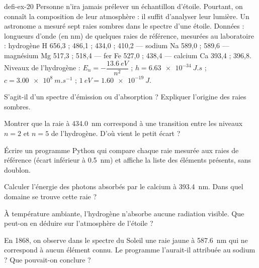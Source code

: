 \begin{blocEdition}{defi-ex-20}
Personne n'ira jamais prélever un échantillon d'étoile. Pourtant, on connaît la composition de leur atmosphère : il suffit d'analyser
leur lumière. Un astronome a mesuré sept raies sombres dans le spectre d'une étoile.
Données : longueurs d'onde (en nm) de quelques raies de référence, mesurées au laboratoire : hydrogène H 656,3 ; 486,1 ; 434,0 ;
410,2 — sodium Na 589,0 ; 589,6 — magnésium Mg 517,3 ; 518,4 — fer Fe 527,0 ; 438,4 — calcium Ca 393,4 ; 396,8. Niveaux de l'hydrogène :
$E_n=-\dfrac{\qty{13,6}{eV}}{n^2}$ ; $h=\qty{6,63e-34}{J.s}$ ; $c=\qty{3,00e8}{m.s^{-1}}$ ; $\qty{1}{eV}=\qty{1,60e-19}{J}$.
\begin{questions}
\item S'agit-il d'un spectre d'émission ou d'absorption ? Expliquer l'origine des raies sombres.
\item Montrer que la raie à \qty{434,0}{nm} correspond à une transition entre les niveaux $n=2$ et $n=5$ de l'hydrogène. D'où vient le petit
écart ?
\item Écrire un programme Python qui compare chaque raie mesurée aux raies de référence (écart inférieur à \qty{0,5}{nm}) et affiche la liste
des éléments présents, sans doublon.
\item Calculer l'énergie des photons absorbés par le calcium à \qty{393,4}{nm}. Dans quel domaine se trouve cette raie ?
\item À température ambiante, l'hydrogène n'absorbe aucune radiation visible. Que peut-on en déduire sur l'atmosphère de l'étoile ?
\item En 1868, on observe dans le spectre du Soleil une raie jaune à \qty{587,6}{nm} qui ne correspond à aucun élément connu. Le programme
l'aurait-il attribuée au sodium ? Que pouvait-on conclure ?
\end{questions}
\end{blocEdition}

